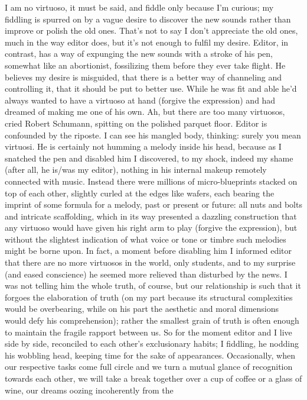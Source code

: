 \documentclass[
]{memoir}
\begin{document}
I am no virtuoso, it must be said, and fiddle only because I'm curious;
my fiddling is spurred on by a vague desire to discover the new sounds
rather than improve or polish the old ones. That's not to say I don't
appreciate the old ones, much in the way editor does, but it's not
enough to fulfil my desire. Editor, in contrast, has a way of expunging
the new sounds with a stroke of his pen, somewhat like an abortionist,
fossilizing them before they ever take flight. He believes my desire is
misguided, that there is a better way of channeling and controlling it,
that it should be put to better use. While he was fit and able he'd
always wanted to have a virtuoso at hand (forgive the expression) and
had dreamed of making me one of his own. Ah, but there are too many
virtuosos, cried Robert Schumann, spitting on the polished parquet
floor. Editor is confounded by the riposte. I can see his mangled body,
thinking: surely you mean virtuosi. He is certainly not humming a melody
inside his head, because as I snatched the pen and disabled him I
discovered, to my shock, indeed my shame (after all, he is/was my
editor), nothing in his internal makeup remotely connected with music.
Instead there were millions of micro-blueprints stacked on top of each
other, slightly curled at the edges like wafers, each bearing the
imprint of some formula for a melody, past or present or future: all
nuts and bolts and intricate scaffolding, which in its way presented a
dazzling construction that any virtuoso would have given his right arm
to play (forgive the expression), but without the slightest indication
of what voice or tone or timbre such melodies might be borne upon. In
fact, a moment before disabling him I informed editor that there are no
more virtuosos in the world, only students, and to my surprise (and
eased conscience) he seemed more relieved than disturbed by the news. I
was not telling him the whole truth, of course, but our relationship is
such that it forgoes the elaboration of truth (on my part because its
structural complexities would be overbearing, while on his part the
aesthetic and moral dimensions would defy his comprehension); rather the
smallest grain of truth is often enough to maintain the fragile rapport
between us. So for the moment editor and I live side by side, reconciled
to each other's exclusionary habits; I fiddling, he nodding his wobbling
head, keeping time for the sake of appearances. Occasionally, when our
respective tasks come full circle and we turn a mutual glance of
recognition towards each other, we will take a break together over a cup
of coffee or a glass of wine, our dreams oozing incoherently from the
\end{document}
